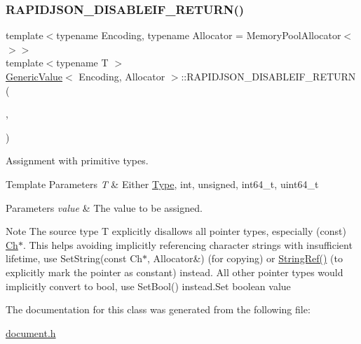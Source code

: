 \subsubsection{\texorpdfstring{R\+A\+P\+I\+D\+J\+S\+O\+N\+\_\+\+D\+I\+S\+A\+B\+L\+E\+I\+F\+\_\+\+R\+E\+T\+U\+R\+N()}{RAPIDJSON\_DISABLEIF\_RETURN()}}
{\footnotesize\ttfamily template$<$typename Encoding, typename Allocator = Memory\+Pool\+Allocator$<$$>$$>$ \\
template$<$typename T $>$ \\
\hyperlink{a01992}{Generic\+Value}$<$ Encoding, Allocator $>$\+::R\+A\+P\+I\+D\+J\+S\+O\+N\+\_\+\+D\+I\+S\+A\+B\+L\+E\+I\+F\+\_\+\+R\+E\+T\+U\+RN (\begin{DoxyParamCaption}\item[{(internal\+::\+Is\+Pointer$<$ T $>$)}]{,  }\item[{(\hyperlink{a01992}{Generic\+Value}$<$ Encoding, Allocator $>$ \&)}]{ }\end{DoxyParamCaption})}



Assignment with primitive types. 


\begin{DoxyTemplParams}{Template Parameters}
{\em T} & Either \hyperlink{a00560_a1d1cfd8ffb84e947f82999c682b666a7}{Type}, {\ttfamily int}, {\ttfamily unsigned}, {\ttfamily int64\+\_\+t}, {\ttfamily uint64\+\_\+t} \\
\hline
\end{DoxyTemplParams}

\begin{DoxyParams}{Parameters}
{\em value} & The value to be assigned.\\
\hline
\end{DoxyParams}
\begin{DoxyNote}{Note}
The source type {\ttfamily T} explicitly disallows all pointer types, especially ({\ttfamily const}) \hyperlink{a01992_ade0e0ce64ccd5d852da57a35e720bafb}{Ch}$\ast$. This helps avoiding implicitly referencing character strings with insufficient lifetime, use Set\+String(const Ch$\ast$, Allocator\&) (for copying) or \hyperlink{a00476_aa6b9fd9f6aa49405a574c362ba9af6b5}{String\+Ref()} (to explicitly mark the pointer as constant) instead. All other pointer types would implicitly convert to {\ttfamily bool}, use Set\+Bool() instead.\+Set boolean value 
\end{DoxyNote}


The documentation for this class was generated from the following file\+:\begin{DoxyCompactItemize}
\item 
\hyperlink{a00476}{document.\+h}\end{DoxyCompactItemize}
